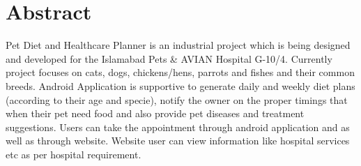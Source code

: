 \chapter*{Abstract}




Pet Diet and Healthcare Planner is an industrial project which is being designed and developed for the Islamabad Pets & AVIAN Hospital G-10/4. Currently project focuses on cats, dogs, chickens/hens, parrots and fishes and their common breeds. Android Application is supportive to generate daily and weekly diet plans (according to their age and specie), notify the owner on the proper timings that when their pet need food and also provide pet diseases and treatment suggestions. Users can take the appointment through android application and as well as through website. Website user can view information like hospital services etc as per   hospital requirement.

